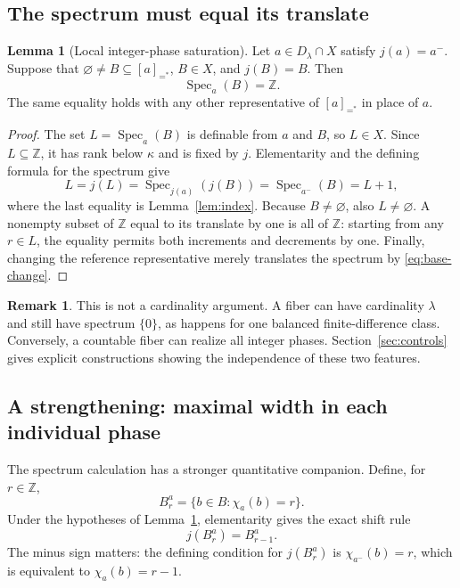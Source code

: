 \documentclass[11pt,letterpaper]{article}
\theoremstyle{definition}
\newtheorem{lemma}[definition]{Lemma}
\newtheorem{remark}[definition]{Remark}
\numberwithin{equation}{section}
\newcommand{\ZZ}{\mathbb Z}
\newcommand{\ch}{\chi}
\newcommand{\Spec}{\operatorname{Spec}}
\newcommand{\eqq}[1]{[#1]_{=^{*}}}
\begin{document}
\subsection{The spectrum must equal its translate}

\begin{lemma}[Local integer-phase saturation]\label{lem:local-phase}
Let $a\in D_\lambda\cap X$ satisfy $j(a)=a^-$. Suppose that $\varnothing\ne B\subseteq\eqq a$, $B\in X$, and $j(B)=B$. Then
\begin{equation}
\Spec_a(B)=\ZZ.\label{eq:full-spectrum}
\end{equation}
The same equality holds with any other representative of $\eqq a$ in place of $a$.
\end{lemma}
\begin{proof}
The set $L=\Spec_a(B)$ is definable from $a$ and $B$, so $L\in X$. Since $L\subseteq\ZZ$, it has rank below $\kappa$ and is fixed by $j$. Elementarity and the defining formula for the spectrum give
\[
L=j(L)=\Spec_{j(a)}(j(B))=\Spec_{a^-}(B)=L+1,
\]
where the last equality is Lemma~\ref{lem:index}. Because $B\ne\varnothing$, also $L\ne\varnothing$. A nonempty subset of $\ZZ$ equal to its translate by one is all of $\ZZ$: starting from any $r\in L$, the equality permits both increments and decrements by one. Finally, changing the reference representative merely translates the spectrum by \eqref{eq:base-change}.
\end{proof}

\begin{remark}
This is not a cardinality argument. A fiber can have cardinality $\lambda$ and still have spectrum $\{0\}$, as happens for one balanced finite-difference class. Conversely, a countable fiber can realize all integer phases. Section~\ref{sec:controls} gives explicit constructions showing the independence of these two features.
\end{remark}

\subsection{A strengthening: maximal width in each individual phase}

The spectrum calculation has a stronger quantitative companion. Define, for $r\in\ZZ$,
\[
B_r^a=\{b\in B:\ch_a(b)=r\}.
\]
Under the hypotheses of Lemma~\ref{lem:local-phase}, elementarity gives the exact shift rule
\begin{equation}
j(B_r^a)=B_{r-1}^a.\label{eq:phase-shift}
\end{equation}
The minus sign matters: the defining condition for $j(B_r^a)$ is
$\ch_{a^-}(b)=r$, which is equivalent to $\ch_a(b)=r-1$.
\end{document}
